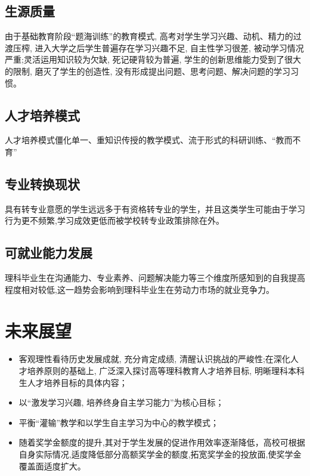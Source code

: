 \documentclass{ctexart}
\begin{document}
\subsection{生源质量}
由于基础教育阶段“题海训练”的教育模式, 高考对学生学习兴趣、动机、精力的过渡压榨, 进入大学之后学生普遍存在学习兴趣不足, 自主性学习很差, 被动学习情况严重;灵活运用知识较为欠缺, 死记硬背较为普遍, 学生的创新思维能力受到了很大的限制, 磨灭了学生的创造性, 没有形成提出问题、思考问题、解决问题的学习习惯。
\subsection{人才培养模式}
人才培养模式僵化单一、重知识传授的教学模式、流于形式的科研训练、“教而不育”
\subsection{专业转换现状}
具有转专业意愿的学生远远多于有资格转专业的学生，并且这类学生可能由于学习行为更不频繁,学习成效更低而被学校转专业政策排除在外。
\subsection{可就业能力发展}
理科毕业生在沟通能力、专业素养、问题解决能力等三个维度所感知到的自我提高程度相对较低,这一趋势会影响到理科毕业生在劳动力市场的就业竞争力。


\section{未来展望}
\begin{itemize}
	\item 客观理性看待历史发展成就, 充分肯定成绩, 清醒认识挑战的严峻性;在深化人才培养原则的基础上, 广泛深入探讨高等理科教育人才培养目标, 明晰理科本科生人才培养目标的具体内容；
	\item 以“激发学习兴趣, 培养终身自主学习能力”为核心目标；
	\item 平衡“灌输”教学和以学生自主学习为中心的教学模式；
	\item 随着奖学金额度的提升,其对于学生发展的促进作用效率逐渐降低，高校可根据自身实际情况,适度降低部分高额奖学金的额度,拓宽奖学金的投放面,使奖学金覆盖面适度扩大。
\end{itemize}
\end{document}
